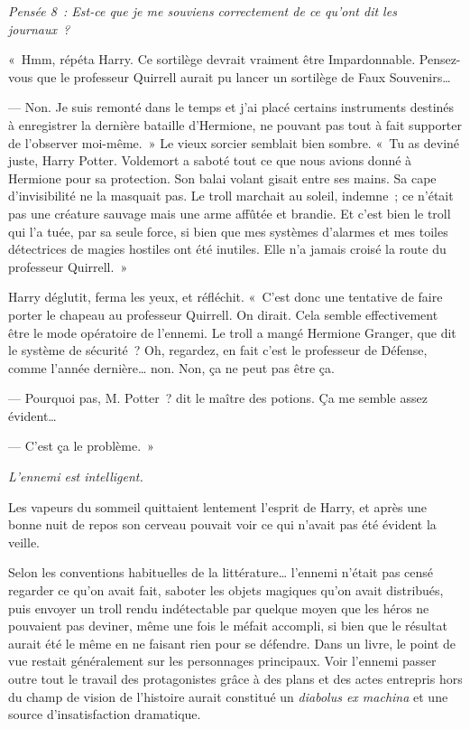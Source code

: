\emph{Pensée 8~: Est-ce que je me souviens correctement de ce qu'ont dit les journaux~?}

«~Hmm, répéta Harry. Ce sortilège devrait vraiment être Impardonnable. Pensez-vous que le professeur Quirrell aurait pu lancer un sortilège de Faux Souvenirs…

--- Non. Je suis remonté dans le temps et j'ai placé certains instruments destinés à enregistrer la dernière bataille d'Hermione, ne pouvant pas tout à fait supporter de l'observer moi-même.~» Le vieux sorcier semblait bien sombre. «~Tu as deviné juste, Harry Potter. Voldemort a saboté tout ce que nous avions donné à Hermione pour sa protection. Son balai volant gisait entre ses mains. Sa cape d'invisibilité ne la masquait pas. Le troll marchait au soleil, indemne~; ce n'était pas une créature sauvage mais une arme affûtée et brandie. Et c'est bien le troll qui l'a tuée, par sa seule force, si bien que mes systèmes d'alarmes et mes toiles détectrices de magies hostiles ont été inutiles. Elle n'a jamais croisé la route du professeur Quirrell.~»

Harry déglutit, ferma les yeux, et réfléchit. «~C'est donc une tentative de faire porter le chapeau au professeur Quirrell. On dirait. Cela semble effectivement être le mode opératoire de l'ennemi. Le troll a mangé Hermione Granger, que dit le système de sécurité~? Oh, regardez, en fait c'est le professeur de Défense, comme l'année dernière… non. Non, ça ne peut pas être ça.

--- Pourquoi pas, M. Potter~? dit le maître des potions. Ça me semble assez évident…

--- C'est ça le problème.~»

\emph{L'ennemi est intelligent.}

Les vapeurs du sommeil quittaient lentement l'esprit de Harry, et après une bonne nuit de repos son cerveau pouvait voir ce qui n'avait pas été évident la veille.

Selon les conventions habituelles de la littérature… l'ennemi n'était pas censé regarder ce qu'on avait fait, saboter les objets magiques qu'on avait distribués, puis envoyer un troll rendu indétectable par quelque moyen que les héros ne pouvaient pas deviner, même une fois le méfait accompli, si bien que le résultat aurait été le même en ne faisant rien pour se défendre. Dans un livre, le point de vue restait généralement sur les personnages principaux. Voir l'ennemi passer outre tout le travail des protagonistes grâce à des plans et des actes entrepris hors du champ de vision de l'histoire aurait constitué un \emph{diabolus ex machina} et une source d'insatisfaction dramatique.

